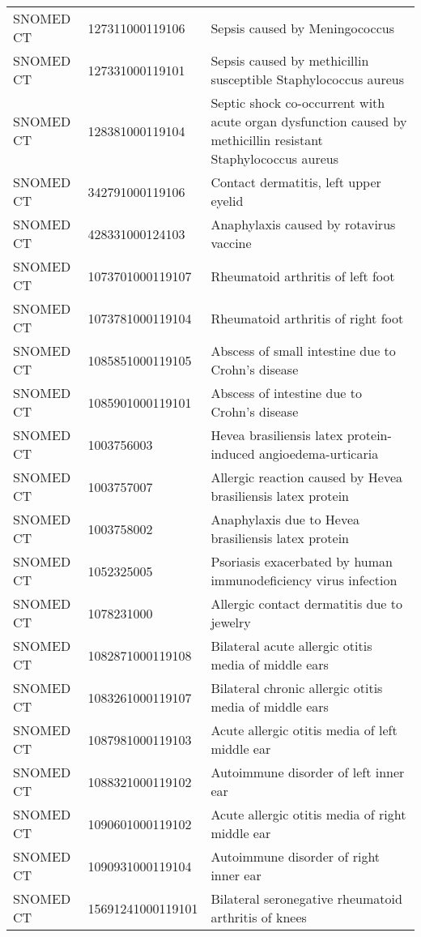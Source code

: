 \begin{longtable}{p{}p{}p{}}
  SNOMED CT & 127311000119106 & Sepsis caused by Meningococcus \\ 
  SNOMED CT & 127331000119101 & Sepsis caused by methicillin susceptible Staphylococcus aureus \\ 
  SNOMED CT & 128381000119104 & Septic shock co-occurrent with acute organ dysfunction caused by methicillin resistant Staphylococcus aureus \\ 
  SNOMED CT & 342791000119106 & Contact dermatitis, left upper eyelid \\ 
  SNOMED CT & 428331000124103 & Anaphylaxis caused by rotavirus vaccine \\ 
  SNOMED CT & 1073701000119107 & Rheumatoid arthritis of left foot \\ 
  SNOMED CT & 1073781000119104 & Rheumatoid arthritis of right foot \\ 
  SNOMED CT & 1085851000119105 & Abscess of small intestine due to Crohn's disease \\ 
  SNOMED CT & 1085901000119101 & Abscess of intestine due to Crohn's disease \\ 
  SNOMED CT & 1003756003 & Hevea brasiliensis latex protein-induced angioedema-urticaria \\ 
  SNOMED CT & 1003757007 & Allergic reaction caused by Hevea brasiliensis latex protein \\ 
  SNOMED CT & 1003758002 & Anaphylaxis due to Hevea brasiliensis latex protein \\ 
  SNOMED CT & 1052325005 & Psoriasis exacerbated by human immunodeficiency virus infection \\ 
  SNOMED CT & 1078231000 & Allergic contact dermatitis due to jewelry \\ 
  SNOMED CT & 1082871000119108 & Bilateral acute allergic otitis media of middle ears \\ 
  SNOMED CT & 1083261000119107 & Bilateral chronic allergic otitis media of middle ears \\ 
  SNOMED CT & 1087981000119103 & Acute allergic otitis media of left middle ear \\ 
  SNOMED CT & 1088321000119102 & Autoimmune disorder of left inner ear \\ 
  SNOMED CT & 1090601000119102 & Acute allergic otitis media of right middle ear \\ 
  SNOMED CT & 1090931000119104 & Autoimmune disorder of right inner ear \\ 
  SNOMED CT & 15691241000119101 & Bilateral seronegative rheumatoid arthritis of knees \\ 

\end{longtable}
